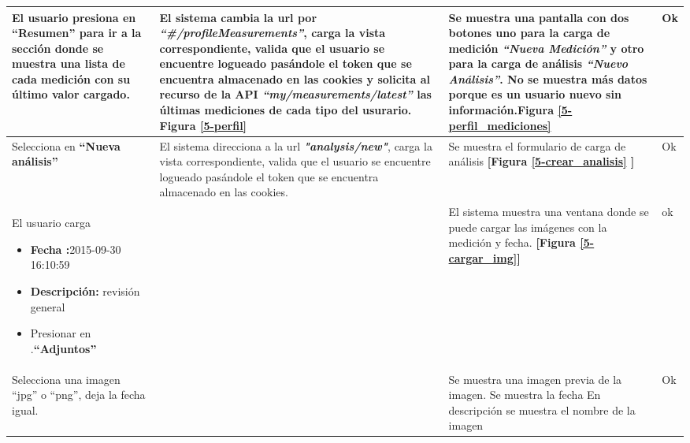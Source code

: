 {\begin{longtable}{|m{3.5cm}|m{3.5cm}|m{3.5cm}|m{2.5cm}|}
  			
  			El usuario presiona en \textbf{``Resumen'' } para ir a la sección donde se muestra una lista de cada medición con su último valor cargado.
  			
  			& El sistema cambia la url por \textit{\textbf{``\#/profileMeasurements''}}, carga la vista correspondiente, valida que el usuario se encuentre logueado pasándole el token que se encuentra almacenado en las cookies y solicita al recurso de la API \textit{\textbf{``my/measurements/latest'' }}las últimas mediciones de cada tipo del usurario. \textbf{Figura \ref{5-perfil}}
  			
  			& Se muestra una pantalla con dos botones uno para la carga de medición
  			\textit{\textbf{``Nueva Medición'' }}y otro para la carga de análisis \textit{\textbf{``Nuevo Análisis''}}. No se muestra más datos porque es un usuario nuevo sin información.\textbf{Figura \ref{5-perfil_mediciones}}
  			& Ok
  			\\ \hline
  			
  			
  			
  			Selecciona en \textbf{``Nueva análisis'' }
  			& El sistema direcciona a la url \textit{\textbf{"analysis/new"}}, carga la vista correspondiente, valida que el usuario se encuentre logueado pasándole el token que se encuentra almacenado en las cookies.
  			
  			& Se muestra el formulario de carga de análisis \textbf{[Figura \ref{5-crear_analisis} ]}
  			& Ok
  			\\ \hline
  			
  			
  			
  			El usuario carga
  			
  			\begin{itemize}
  				\item \textbf{Fecha :}2015-09-30 16:10:59
  				\item \textbf{Descripción: }revisión general
  				\item Presionar en .\textbf{``Adjuntos''}
  				
  			\end{itemize}
  			
  			&
  			& El sistema muestra una ventana donde se puede cargar las imágenes con la medición y fecha.\textbf{ [Figura  \ref{5-cargar_img}]}
  			&ok
  			
  			\\ \hline
  			
  			
  			
  			Selecciona una imagen ``jpg'' o ``png'', deja la fecha igual. 
  			&
  			& Se muestra una imagen previa de la imagen. Se muestra la fecha En descripción se muestra el nombre de la imagen
  			& Ok
  			\\ \hline
  			

\end{longtable}}
